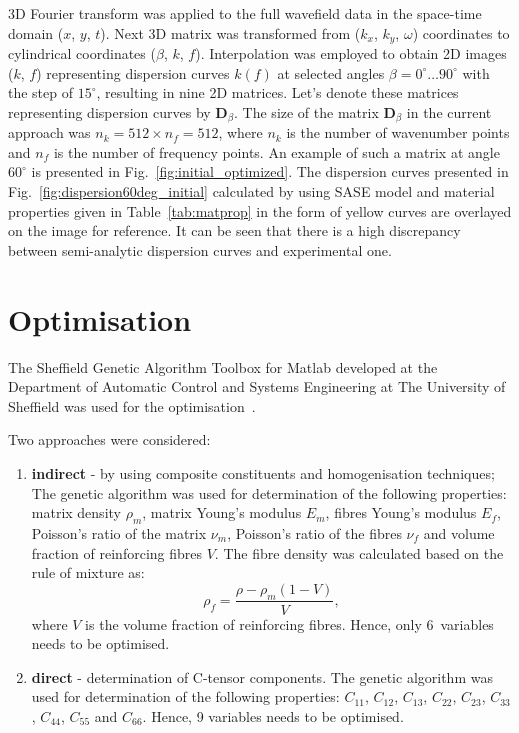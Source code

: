 \documentclass[preprint,12pt]{elsarticle}
\newcommand{\matr}[1]{\mathbf{#1}} %
\begin{document}
3D Fourier transform was applied to the full wavefield data in the space-time domain 
(\(x\), \(y\), \(t\)). Next 3D matrix was transformed from (\(k_x\), \(k_y\), \(\omega\)) 
coordinates to cylindrical coordinates (\(\beta\), \(k\), \(f\)). Interpolation was employed 
to obtain 2D images (\(k\), \(f\)) representing dispersion curves \(k(f)\) at selected 
angles \(\beta = 0^{\circ} \ldots 90^{\circ}\) with the step of \(15^{\circ}\), resulting in 
nine 
2D matrices. Let's denote these matrices representing dispersion curves by 
\(\matr{D}_{\beta}\). The size of the matrix  \(\matr{D}_{\beta}\) in the current approach 
was \(n_k=512 \times n_f= 512\), where \(n_k\) is the number of wavenumber points 
and \(n_f\) is the number of frequency points.  An example of such a matrix at angle \( 
60^{\circ}\) is presented in Fig.~\ref{fig:initial_optimized}. The dispersion curves 
presented in Fig.~\ref{fig:dispersion60deg_initial} calculated by using SASE model and 
material properties given in Table~\ref{tab:matprop} in the form of yellow curves are 
overlayed on the image for reference. It can be seen that there is a high discrepancy 
between semi-analytic dispersion curves and experimental one. 
	\section{Optimisation \label{sec:optimization}}
	The Sheffield Genetic Algorithm Toolbox for Matlab developed at the Department of 
	Automatic Control 
and Systems Engineering at The University of Sheffield was used for the 
optimisation~\cite{Chipperfield1994}.
	
	Two approaches were considered:
	\begin{enumerate}
		\item \textbf{indirect} - by using composite constituents and homogenisation 
		techniques;
		The genetic algorithm was used for determination of the following properties:  
		matrix density \(\rho_m\), matrix Young's modulus \(E_m\), fibres Young's modulus 
		\(E_f\), Poisson's ratio of the matrix \(\nu_m\), Poisson's ratio of the fibres \(\nu_f\) 
		and volume fraction of reinforcing fibres \(V\).  The fibre density was calculated 
		based on the rule of mixture as:
		\begin{equation}
		\rho_f = \frac{\rho - \rho_m (1-V)}{V},
		\end{equation}
		where \(V\) is the volume fraction of reinforcing fibres. Hence, only 6~variables 
		needs to be optimised.
		\item \textbf{direct} - determination of C-tensor components.
		The genetic algorithm was used for determination of the following properties: 
		\(C_{11}\), \(C_{12}\), \(C_{13}\),  \(C_{22}\), \(C_{23}\), \(C_{33}\), \(C_{44}\), 
		\(C_{55}\) and \(C_{66}\). Hence, 9 variables needs to be optimised.
	\end{enumerate}
\end{document}
